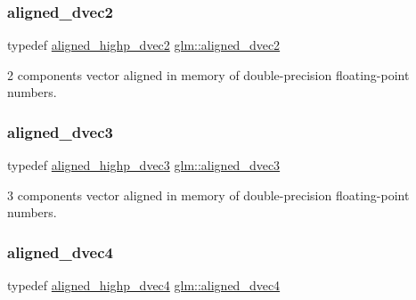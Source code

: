 \subsubsection{\texorpdfstring{aligned\+\_\+dvec2}{aligned\_dvec2}}
{\footnotesize\ttfamily typedef \hyperlink{group__gtc__type__aligned_gadc0edec95aa740d8ec351ef1e2dd39de}{aligned\+\_\+highp\+\_\+dvec2} \hyperlink{group__gtc__type__aligned_ga1e6972e837bc34b3424af8d63a71d7c6}{glm\+::aligned\+\_\+dvec2}}



2 components vector aligned in memory of double-\/precision floating-\/point numbers. 

\mbox{\label{group__gtc__type__aligned_ga82da11893fbac3bda647c9de9da62693}} 
\subsubsection{\texorpdfstring{aligned\+\_\+dvec3}{aligned\_dvec3}}
{\footnotesize\ttfamily typedef \hyperlink{group__gtc__type__aligned_gafb21f8db25007665c2cb2a9b250471aa}{aligned\+\_\+highp\+\_\+dvec3} \hyperlink{group__gtc__type__aligned_ga82da11893fbac3bda647c9de9da62693}{glm\+::aligned\+\_\+dvec3}}



3 components vector aligned in memory of double-\/precision floating-\/point numbers. 

\mbox{\label{group__gtc__type__aligned_ga502d8d084a488118c9a5466d73ba1a46}} 
\subsubsection{\texorpdfstring{aligned\+\_\+dvec4}{aligned\_dvec4}}
{\footnotesize\ttfamily typedef \hyperlink{group__gtc__type__aligned_ga4b7b03b9178c6f0574c26181a054beec}{aligned\+\_\+highp\+\_\+dvec4} \hyperlink{group__gtc__type__aligned_ga502d8d084a488118c9a5466d73ba1a46}{glm\+::aligned\+\_\+dvec4}}



